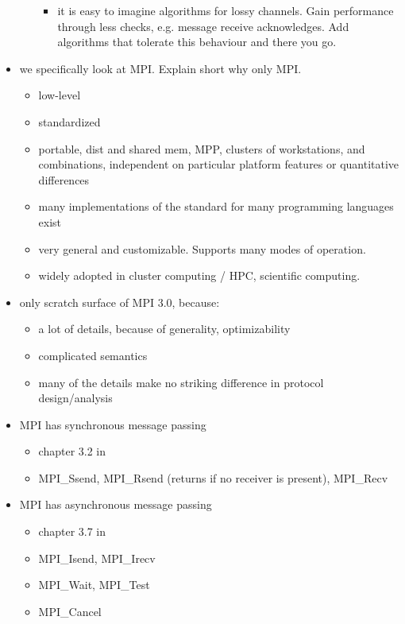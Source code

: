 \documentclass[a4paper, 10pt]{article}
\begin{document}
\begin{itemize}
\begin{itemize}
\begin{itemize}
					\item it is easy to imagine algorithms for lossy channels. Gain performance through less checks, e.g. message receive acknowledges. Add algorithms that tolerate this behaviour and there you go.
				\end{itemize}
		\end{itemize}
	\label{why-only-mpi}
	\item we specifically look at MPI. Explain short why only MPI.
		\begin{itemize}
			\item low-level
			\item standardized
			\item portable, dist and shared mem, MPP, clusters of workstations, and combinations, independent on particular platform features or quantitative differences
			\item many implementations of the standard for many programming languages exist
			\item very general and customizable. Supports many modes of operation.
			\item widely adopted in cluster computing / HPC, scientific computing.~\cite{mpiadoptiona}\cite{mpiadoptionb}\cite{mpiadoptionc}
		\end{itemize}
	\item only scratch surface of MPI 3.0, because:
		\begin{itemize}
			\item a lot of details, because of generality, optimizability
			\item complicated semantics
			\item many of the details make no striking difference in protocol design/analysis
		\end{itemize}
	\item MPI has synchronous message passing
		\begin{itemize}
			\item chapter 3.2 in \cite{mpi3}
			\item MPI\_Ssend, MPI\_Rsend (returns if no receiver is present), MPI\_Recv
		\end{itemize}
	\item MPI has asynchronous message passing
		\begin{itemize}
			\item chapter 3.7 in \cite{mpi3}
			\item MPI\_Isend, MPI\_Irecv
			\item MPI\_Wait, MPI\_Test
			\item MPI\_Cancel

\end{itemize}
\end{itemize}
\end{document}
